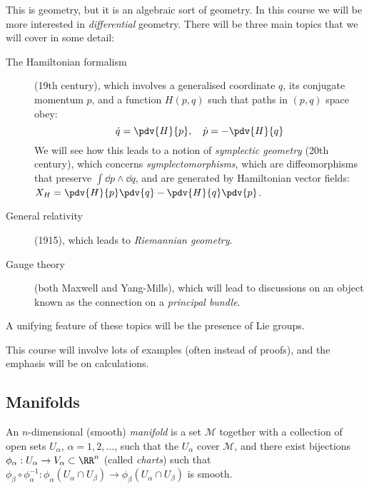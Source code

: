 \documentclass{jknotes}
\begin{document}
This is geometry, but it is an algebraic sort of geometry. In this course we will be more interested in \emph{differential} geometry. There will be three main topics that we will cover in some detail:
\begin{description}
    \item[The Hamiltonian formalism] (19th century), which involves a generalised coordinate \(q\), its conjugate momentum \(p\), and a function \(H(p,q)\) such that paths in \((p,q)\) space obey:
        \begin{equation}
            \dot{q}=\pdv{H}{p},\quad\dot{p}=-\pdv{H}{q}
        \end{equation}
        We will see how this leads to a notion of \emph{symplectic geometry} (20th century), which concerns \emph{symplectomorphisms}, which are diffeomorphisms that preserve \(\int\dd{p}\wedge\dd{q}\), and are generated by Hamiltonian vector fields: \(X_H=\pdv{H}{p}\pdv{q}-\pdv{H}{q}\pdv{p}\).
    \item[General relativity] (1915), which leads to \emph{Riemannian geometry}.
    \item[Gauge theory] (both Maxwell and Yang-Mills), which will lead to discussions on an object known as the connection on a \emph{principal bundle}.
\end{description}

A unifying feature of these topics will be the presence of Lie groups.

This course will involve lots of examples (often instead of proofs), and the emphasis will be on calculations.

\subsection{Manifolds}
\begin{defn}
    An \(n\)-dimensional (smooth) \emph{manifold} is a set \(\mathcal{M}\) together with a collection of open sets \(U_\alpha\), \(\alpha = 1,2,\dots\), such that the \(U_\alpha\) cover \(\mathcal{M}\), and there exist bijections \(\phi_\alpha:U_\alpha\rightarrow V_\alpha\subset\RR^n\) (called \emph{charts}) such that \(\phi_\beta\circ\phi_\alpha^{-1}:\phi_\alpha(U_\alpha\cap U_\beta) \rightarrow \phi_\beta(U_\alpha\cap U_\beta)\) is smooth.
\end{defn}
\end{document}
